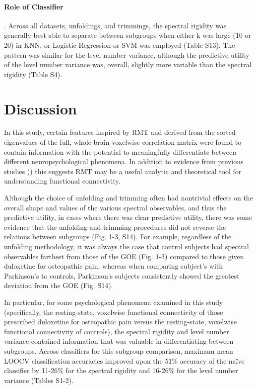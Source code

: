 \paragraph{Role of Classifier}. Across all datasets, unfoldings, and trimmings, the spectral rigidity was
generally best able to separate between subgroups when either k was large (10 or 20) in KNN, or
Logistic Regression or SVM was employed (Table S13). The pattern was similar for the level number
variance, although the predictive utility of the level number variance was, overall, slightly more
variable than the spectral rigidity (Table S4).

\section{Discussion}
In this study, certain features inspired by RMT and derived from the sorted eigenvalues of the full,
whole-brain voxelwise correlation matrix were found to contain information with the potential to
meaningfully differentiate between different neuropsychological phenomena. In addition to evidence
from previous studies
(\cite{sebaRandomMatrixAnalysis2003,wangRandomMatrixTheory2016,matharooSpontaneousBackpainAlters2020})
this suggests RMT may be a useful analytic and theoretical tool for understanding functional
connectivity.

Although the choice of unfolding and trimming often had nontrivial effects on the overall shape and
values of the various spectral observables, and thus the predictive utility, in cases where there
was clear predictive utility, there was some evidence that the unfolding and trimming procedures did
not reverse the relations between subgroups (Fig. 1-3, S14). For example, regardless of the
unfolding methodology, it was always the case that control subjects had spectral observables
farthest from those of the GOE (Fig. 1-3) compared to those given duloxetine for osteopathic pain,
whereas when comparing subject's with Parkinson's to controls, Parkinson's subjects consistently
showed the greatest deviation from the GOE (Fig. S14).

In particular, for some psychological phenomena examined in this study (specifically, the
resting-state, voxelwise functional connectivity of those prescribed duloxetine for osteopathic pain
versus the resting-state, voxelwise functional connectivity of controls), the spectral rigidity and
level number variance contained information that was valuable in differentiating between subgroups.
Across classifiers for this subgroup comparison, maximum mean LOOCV classification accuracies
improved upon the 51\% accuracy of the naïve classifier by 11-26\% for the spectral rigidity and
16-26\% for the level number variance (Tables S1-2).

